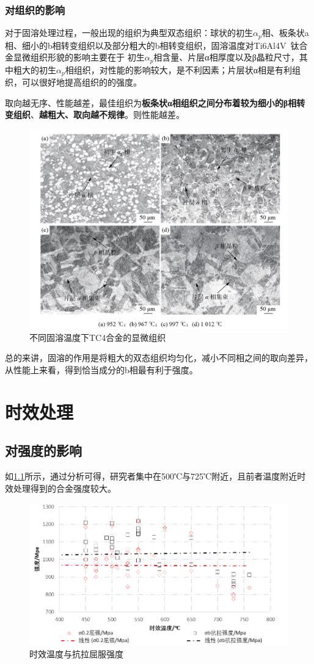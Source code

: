 \documentclass[
class = book,
zihao = -4,
font = noto,
paper = a4paper,
openany
]{easybook}
\begin{document}
\subsection{对组织的影响}
对于固溶处理过程，一般出现的组织为典型双态组织：球状的初生$ \alpha_p $相、板条状a相、细小的b相转变组织以及部分粗大的b相转变组织\cite{zhanghaoyinGurongShixiaoduiTC4taihejinzuzhihelixuexingnengdeyingxiang2014}，固溶温度对Ti6Al4V 钛合金显微组织形貌的影响主要在于 初生$ \alpha_p $相含量、片层α相厚度以及β晶粒尺寸，其中粗大的初生$ α_p $相组织，对性能的影响较大，是不利因素；片层状α相是有利组织，可以很好地提高组织的的强度\cite{ranxingGurongwenduduiTi6Al4VELItaihejinxianweizuzhijixingnengdeyingxiang2021}。

取向越无序、性能越差，最佳组织为\textbf{板条状α相组织之间分布着较为细小的β相转变组织}、\textbf{越粗大、取向越不规律}。则性能越差。
\begin{figure}[h!]
	\centering
	\includegraphics[width=0.7\linewidth]{金相_丙}
	\caption{不同固溶温度下TC4合金的显微组织}
	\label{fig:}
\end{figure}


总的来讲，固溶的作用是将粗大的双态组织均匀化，减小不同相之间的取向差异，从性能上来看，得到恰当成分的b相最有利于强度。


\chapter{时效处理}

\section{对强度的影响}
如\ref{fig:时效温度与抗拉屈服强度}所示，通过分析可得，研究者集中在500℃与725℃附近，且前者温度附近时效处理得到的合金强度较大。
\begin{figure}[h!]
	\centering
	\includegraphics[width=0.7\linewidth]{时效温度与强度}
	\caption{时效温度与抗拉屈服强度}
	\label{fig:时效温度与抗拉屈服强度}
\end{figure}
\end{document}
